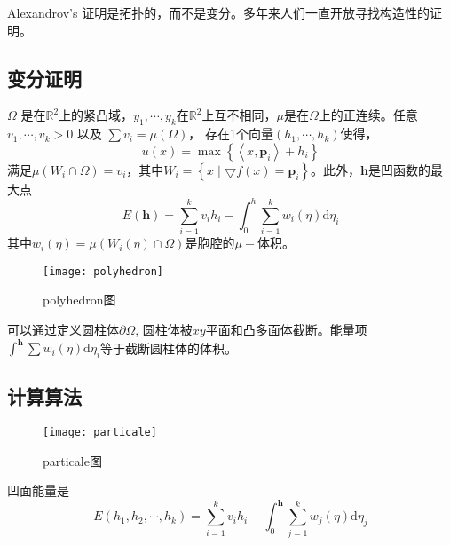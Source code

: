 Alexandrov’s 证明是拓扑的，而不是变分。多年来人们一直开放寻找构造性的证明。

\subsection{变分证明}

\begin{theorem}
    $\Omega$ 是在$\mathbb{R}^2$上的紧凸域，$y_1, \cdots , y_k$在$\mathbb{R}^2$上互不相同，$\mu$是在$\Omega$上的正连续。任意$v_1, \cdots , v_k > 0$ 以及 $\sum v_i =\mu(\Omega)$，
    存在1个向量$(h_1, \cdots , h_k)$使得，
    \begin{equation*}
        u(x)=\max \left \{ \left \langle x ,\mathbf{p}_i  \right \rangle +h_i  \right \} 
    \end{equation*}
    满足$\mu(W_i \cap \Omega)=v_i$，其中$W_i=\left \{  x \mid \bigtriangledown f(x)=\mathbf{p}_i   \right \} $。此外，$\mathbf{h}$是凹函数的最大点
    \begin{equation}
        E(\mathbf{h})=\sum_{i=1}^{k}v_ih_i - \int_{0}^{h} \sum_{i=1}^{k} w_i(\eta )\mathrm{d}\eta _i    
    \end{equation}
    其中$w_i(\eta)=\mu(W_i(\eta) \cap \Omega)$是胞腔的$\mu -$体积。
    \label{theorem:Gu-Luo-Sun-Yau 2013}
\end{theorem}

\begin{figure}[h]
    \centering
    \texttt{[image: polyhedron]}
    \caption{ polyhedron图}
	\label{fig: polyhedron}
\end{figure}

可以通过定义圆柱体$\partial \Omega$, 圆柱体被$xy$平面和凸多面体截断。能量项$\int ^{\mathbf{h}}\sum w_i (\eta) \mathrm{d}\eta_i$等于截断圆柱体的体积。

\subsection{计算算法}

\begin{figure}[h]
    \centering
    \texttt{[image: particale]}
    \caption{ particale图}
	\label{fig: particale}
\end{figure}

\begin{definition}
    凹面能量是
    \begin{equation}
        E(h_1, h_2, \cdots , h_k) = \sum_{i=1}^k v_ih_i - \int_0^{\mathbf{h}} \sum_{j=1}^k w_j(\eta)\mathrm{d}\eta_j 
        \label{equ:Alexandrov Potential}
    \end{equation}
    \label{def:Alexandrov Potential}
\end{definition}

